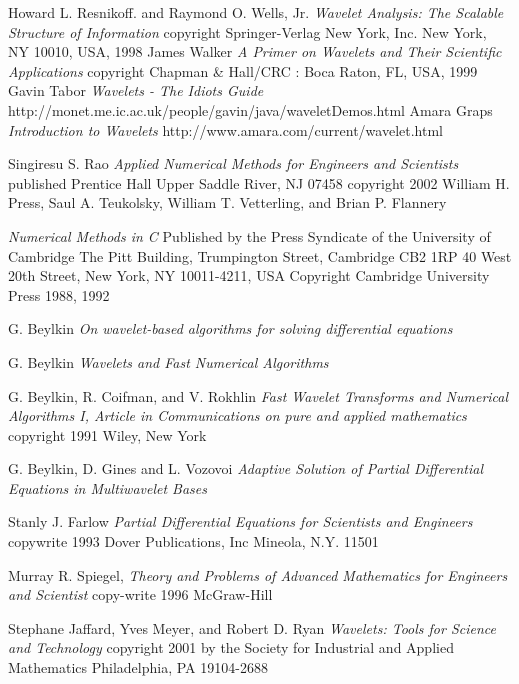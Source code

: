 \documentclass[11pt]{report}
\begin{document}
\begin{thebibliography}{99}
Howard L. Resnikoff. and Raymond O. Wells, Jr. \textsl {Wavelet Analysis: The Scalable Structure of Information}  copyright Springer-Verlag New York, Inc.  New York, NY 10010, USA, 1998
James Walker \textsl {A Primer on Wavelets and Their Scientific Applications}
copyright Chapman \& Hall/CRC : Boca Raton, FL, USA, 1999
Gavin Tabor \textsl {Wavelets - The Idiots Guide} http://monet.me.ic.ac.uk/people/gavin/java/waveletDemos.html
 Amara Graps \textsl {Introduction to Wavelets} http://www.amara.com/current/wavelet.html 

 Singiresu S. Rao \textsl{Applied Numerical Methods for Engineers and Scientists}  published Prentice Hall Upper Saddle River, NJ 07458 copyright  2002
 William H. Press, Saul A. Teukolsky, William T. Vetterling, and Brian P. Flannery 

\textsl {Numerical Methods in C}
Published by the Press Syndicate of the University of Cambridge The Pitt Building, Trumpington Street, Cambridge CB2 1RP
40 West 20th Street, New York, NY 10011-4211, USA
Copyright Cambridge University Press 1988, 1992

  G. Beylkin \textsl{On wavelet-based algorithms for solving differential equations}

  G. Beylkin \textsl{Wavelets and Fast Numerical Algorithms}

 G. Beylkin, R. Coifman, and V. Rokhlin \textsl {Fast Wavelet Transforms and Numerical Algorithms I, Article in Communications on pure and applied mathematics} copyright 1991 Wiley, New York

  G. Beylkin, D. Gines and L. Vozovoi \textsl{Adaptive Solution of Partial Differential Equations in Multiwavelet Bases }

 Stanly J. Farlow \textsl{Partial Differential Equations for Scientists and Engineers} copywrite 1993 Dover Publications, Inc Mineola, N.Y. 11501

 Murray R. Spiegel, \textsl { Theory and Problems of Advanced Mathematics for Engineers and Scientist} copy-write 1996 McGraw-Hill 

 Stephane Jaffard, Yves Meyer, and Robert D. Ryan \textsl {Wavelets: Tools for Science and Technology} copyright 2001 by the Society for Industrial and Applied Mathematics Philadelphia, PA 19104-2688


\end{thebibliography}
\end{document}
